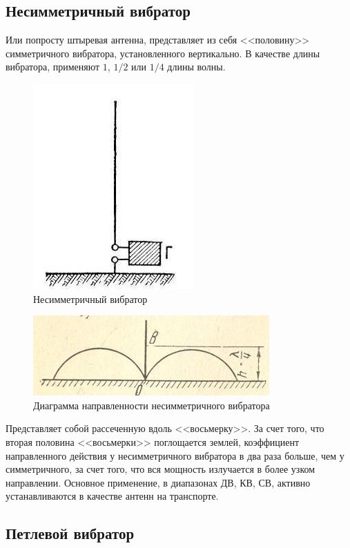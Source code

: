 \subsection{Несимметричный вибратор}

Или попросту штыревая антенна, представляет из себя <<половину>> симметричного вибратора, установленного вертикально.
В качестве длины вибратора, применяют $1$, $1/2$ или $1/4$ длины волны.

\begin{figure}[H]
    \centering
    \includegraphics{img/3.jpg}
    \caption{Несимметричный вибратор}
\end{figure}


\begin{figure}[H]
    \centering
    \includegraphics{img/4.jpg}
    \caption{Диаграмма направленности несимметричного вибратора}
\end{figure}

Представляет собой рассеченную вдоль <<восьмерку>>. За счет того, что вторая половина <<восьмерки>> поглощается землей, коэффициент направленного действия у несимметричного вибратора в два раза больше, чем у симметричного, за счет того, что вся мощность излучается в более узком направлении.
Основное применение, в диапазонах ДВ, КВ, СВ, активно устанавливаются в качестве антенн на транспорте.

\subsection{Петлевой вибратор}

